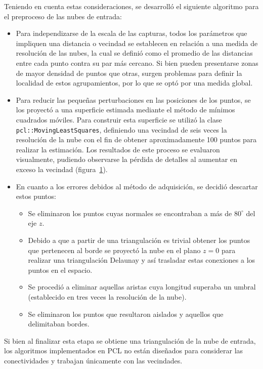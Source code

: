 Teniendo en cuenta estas consideraciones, se desarrolló el siguiente algoritmo
para el preproceso de las nubes de entrada:
\begin{itemize}
	\item Para independizarse de la escala de las capturas,
todos los parámetros que impliquen una distancia o vecindad
se establecen en relación a una medida de resolución de las nubes,
la cual se definió como el promedio de las distancias entre cada punto
contra su par más cercano.
Si bien pueden presentarse zonas de mayor densidad de puntos que otras,
surgen problemas para definir la localidad de estos agrupamientos,
por lo que se optó por una medida global.

\item Para reducir las pequeñas perturbaciones en las posiciones de los puntos,
se los proyectó a una superficie estimada mediante el método de mínimos cuadrados móviles.
Para construir esta superficie se utilizó la clase
\texttt{pcl::Moving\-Least\-Squares}, definiendo una vecindad de seis veces la
resolución de la nube con el fin de obtener aproximadamente 100 puntos para
realizar la estimación.
Los resultados de este proceso se evaluaron visualmente, pudiendo observarse la pérdida de detalles
al aumentar en exceso la vecindad (figura~\ref{fig:mls}).
\begin{figure}
	\caption{\label{fig:mls}}
\end{figure}

\item En cuanto a los errores debidos al método de adquisición, se decidió descartar estos puntos:
	\begin{itemize}
		\item Se eliminaron los puntos cuyas normales se encontraban a más de $80^{\circ}$ del eje $z$.
		\item Debido a que a partir de una triangulación es trivial obtener los puntos que pertenecen al borde
se proyectó la nube en el plano $z=0$ para realizar una triangulación Delaunay y así
trasladar estas conexiones a los puntos en el espacio.
		\item Se procedió a eliminar aquellas aristas cuya longitud superaba un umbral (establecido en tres veces la resolución de la nube).
		\item Se eliminaron los puntos que resultaron aislados y aquellos que delimitaban bordes.
	\end{itemize}
\end{itemize}

Si bien al finalizar esta etapa se obtiene una triangulación de la nube de entrada,
los algoritmos implementados en PCL no están diseñados para considerar las conectividades y trabajan únicamente con las vecindades.
